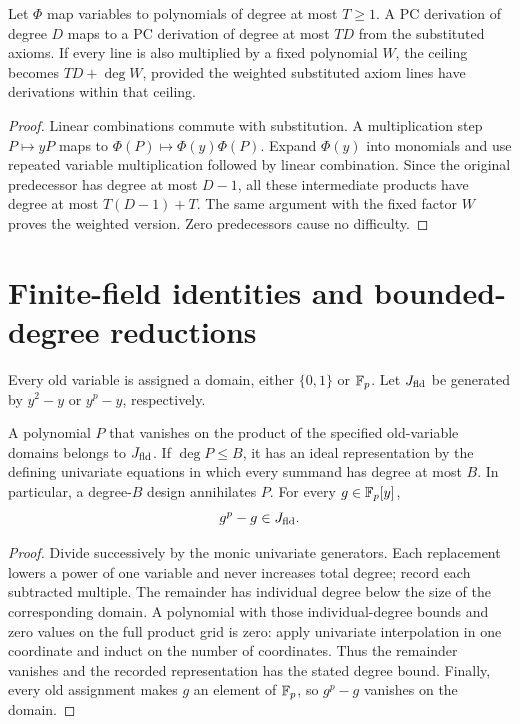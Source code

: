 \begin{lemma}\label{lem:substitution}
Let $\Phi$ map variables to polynomials of degree at most $T\ge1$. A PC derivation of degree $D$ maps to a PC derivation of degree at most $TD$ from the substituted axioms. If every line is also multiplied by a fixed polynomial $W$, the ceiling becomes $TD+\deg W$, provided the weighted substituted axiom lines have derivations within that ceiling.
\end{lemma}
\begin{proof}
Linear combinations commute with substitution. A multiplication step $P\mapsto yP$ maps to $\Phi(P)\mapsto\Phi(y)\Phi(P)$. Expand $\Phi(y)$ into monomials and use repeated variable multiplication followed by linear combination. Since the original predecessor has degree at most $D-1$, all these intermediate products have degree at most $T(D-1)+T$. The same argument with the fixed factor $W$ proves the weighted version. Zero predecessors cause no difficulty.
\end{proof}

\section{Finite-field identities and bounded-degree reductions}
Every old variable is assigned a domain, either $\{0,1\}$ or $\mathbb F_p$. Let $J_{\mathrm{fld}}$ be generated by $y^2-y$ or $y^p-y$, respectively.

\begin{lemma}\label{lem:fieldreduction}
A polynomial $P$ that vanishes on the product of the specified old-variable domains belongs to $J_{\mathrm{fld}}$. If $\deg P\le B$, it has an ideal representation by the defining univariate equations in which every summand has degree at most $B$. In particular, a degree-$B$ design annihilates $P$. For every $g\in\mathbb F_p[y]$,
\[
 g^p-g\in J_{\mathrm{fld}}.
\]
\end{lemma}
\begin{proof}
Divide successively by the monic univariate generators. Each replacement lowers a power of one variable and never increases total degree; record each subtracted multiple. The remainder has individual degree below the size of the corresponding domain. A polynomial with those individual-degree bounds and zero values on the full product grid is zero: apply univariate interpolation in one coordinate and induct on the number of coordinates. Thus the remainder vanishes and the recorded representation has the stated degree bound. Finally, every old assignment makes $g$ an element of $\mathbb F_p$, so $g^p-g$ vanishes on the domain.
\end{proof}

